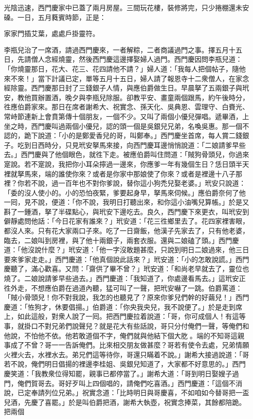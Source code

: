 光陰迅速，西門慶家中已蓋了兩月房屋。三間玩花樓，裝修將完，只少捲棚還未安磉。一日，五月蕤賓時節，正是：

家家門插艾葉，處處戶掛靈符。

李瓶兒治了一席酒，請過西門慶來，一者解粽，二者商議過門之事。擇五月十五日，先請僧人念經燒靈，然後西門慶這邊擇娶婦人過門。西門慶因問李瓶兒道：「你燒靈那日，花大、花三、花四請他不請？」{}婦人道：「我每人把個帖子，隨他來不來！」當下計議已定，單等五月十五日，婦人請了報恩寺十二衆僧人，在家念經除靈。西門慶那日封了三錢銀子人情，與應伯爵做生日。早晨拏了五兩銀子與玳安，教他買辦置酒，晚夕與李瓶兒除服。卻教平安、畫童兩個跟馬，約午後時分，徃應伯爵家來。那日在席者謝希大、祝實念、孫天化、吳典恩、雲理守、白賚光、常峙節連新上會賁第傳十個朋友，一個不少。{}又叫了兩個小優兒彈唱。遞畢酒，上坐之時，西門慶叫過兩個小優兒，認的頭一個是吳銀兒兄弟，名喚吳惠。那一個不認的，{}跪下說道：「小的是鄭愛香兒的哥，叫鄭奉。」西門慶坐首席，每人賞二錢銀子。吃到日西時分，只見玳安拏馬來接，向西門慶耳邊悄悄說道：「二娘請爹早些去。」西門慶與了他個眼色，就徃下走。{}被應伯爵叫住問道：「賊狗骨頭兒，你過來寔說。若不寔說，我把你小耳朵擰過一邊來，你應爹一年有幾個生日？恁日頭半天裡就拏馬來，端的誰使你來？或者是你家中那娘使了你來？或者是裡邊十八子那裡？你若不說，過一百年也不對你爹說，替你這小狗禿兒娶老婆。」玳安只說道：「委的沒人使小的。小的恐怕夜緊，爹要起身早，拏馬來伺候。」應伯爵奈何了他一囘，見不說，便道：「你不說，我明日打聽出來，和你這小油嘴兒算帳。」於是又斟了一鍾酒，拏了半碟點心，與玳安下邊吃去。良久，西門慶下來更衣，叫玳安到僻靜處問他話：「今日花家有誰來？」{}玳安道：「花三徃鄉里去了。花四家裡害眼，都沒人來。只有花大家兩口子來。吃了一日齋飯，他漢子先家去了，只有他老婆，臨去，二娘叫到房裡，與了他十兩銀子，兩套衣服。還與二娘磕了頭。」西門慶道：「他沒說什麼？」玳安道：「他一字沒敢題甚麼，只說到明日二娘過來，他三日要來爹家走走。」西門慶道：「他真個說此話來？」{}玳安道：「小的怎敢說謊。」西門慶聽了，滿心歡喜。又問：「齋供了畢不曾？」玳安道：「和尚老早就去了，靈位也燒了。二娘說請爹早些過去。」西門慶道：「我知道了，你處邊看馬去。」這玳安正徃外走，不想應伯爵在過道內聽，猛可叫了一聲，把玳安嚇了一跳。伯爵罵道：「賊小骨頭兒！你不對我說，我怎的也聽見了？原來你爹兒們幹的好繭兒！」西門慶道：「恠狗才，休要倡揚。」伯爵道：「你央我央兒，我不說便了。」於是走到席上，如此這般，對衆人說了一囘。把西門慶拉着說道：「哥，你可成個人！有這等事，就掛口不對兄弟們說聲兒？就是花大有些話說，哥只分付俺們一聲，等俺們和他說，不怕他不依。他若敢道個不字，俺們就與他結下個大肐𦞂。端的不知哥這親事成了不曾？哥一一告訴俺們。比來相交朋友做甚麼？哥若有使令去處，兄弟情願火裡火去，水裡水去。弟兄們這等待你，哥還只瞞着不說。」{}謝希大接過說道：「哥若不說，俺們明日倡揚的裡邊李桂姐、吳銀兒知道了，大家都不好意思的。」西門慶笑道：「我教衆位得知罷，親事已都停當了。」謝希大道：「哥到明日娶嫂子過門，俺們賀哥去。哥好歹叫上四個唱的，請俺們吃喜酒。」西門慶道：「這個不消說，已定奉請列位兄弟。」祝實念道：「比時明日與哥慶喜，不如咱如今替哥把一盃兒酒，先慶了喜罷。」{}於是叫伯爵把酒，謝希大執壺，祝實念捧菜，其餘都陪跪。把兩個